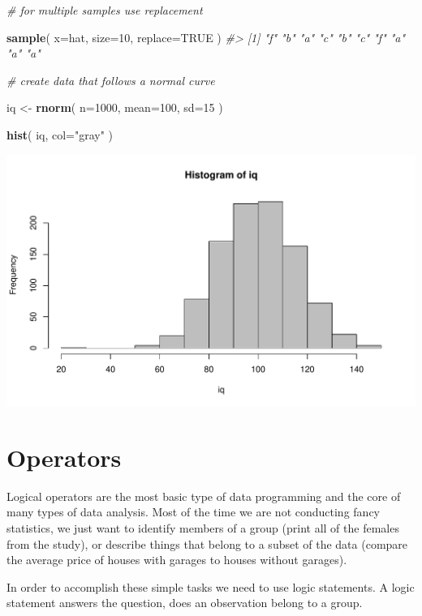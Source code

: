 \documentclass[]{book}
\newenvironment{Shaded}{\begin{snugshade}}{\end{snugshade}}
\newcommand{\CommentTok}[1]{\textcolor[rgb]{0.56,0.35,0.01}{\textit{#1}}}
\newcommand{\DataTypeTok}[1]{\textcolor[rgb]{0.13,0.29,0.53}{#1}}
\newcommand{\DecValTok}[1]{\textcolor[rgb]{0.00,0.00,0.81}{#1}}
\newcommand{\KeywordTok}[1]{\textcolor[rgb]{0.13,0.29,0.53}{\textbf{#1}}}
\newcommand{\NormalTok}[1]{#1}
\newcommand{\OtherTok}[1]{\textcolor[rgb]{0.56,0.35,0.01}{#1}}
\newcommand{\StringTok}[1]{\textcolor[rgb]{0.31,0.60,0.02}{#1}}
\theoremstyle{definition}
\theoremstyle{definition}
\theoremstyle{definition}
\theoremstyle{remark}
\begin{document}
\begin{Shaded}
\begin{Highlighting}[]
\CommentTok{# for multiple samples use replacement}

\KeywordTok{sample}\NormalTok{( }\DataTypeTok{x=}\NormalTok{hat, }\DataTypeTok{size=}\DecValTok{10}\NormalTok{, }\DataTypeTok{replace=}\OtherTok{TRUE}\NormalTok{ )}
\CommentTok{#>  [1] "f" "b" "a" "c" "b" "c" "f" "a" "a" "a"}





\CommentTok{# create data that follows a normal curve}

\NormalTok{iq <-}\StringTok{ }\KeywordTok{rnorm}\NormalTok{( }\DataTypeTok{n=}\DecValTok{1000}\NormalTok{, }\DataTypeTok{mean=}\DecValTok{100}\NormalTok{, }\DataTypeTok{sd=}\DecValTok{15}\NormalTok{ )}

\KeywordTok{hist}\NormalTok{( iq, }\DataTypeTok{col=}\StringTok{"gray"}\NormalTok{ )}
\end{Highlighting}
\end{Shaded}

\begin{center}\includegraphics[width=0.7\linewidth]{DS4PS-I_files/figure-latex/unnamed-chunk-50-1} \end{center}

\hypertarget{operators}{%
\chapter{Operators}\label{operators}}

Logical operators are the most basic type of data programming and the
core of many types of data analysis. Most of the time we are not
conducting fancy statistics, we just want to identify members of a group
(print all of the females from the study), or describe things that
belong to a subset of the data (compare the average price of houses with
garages to houses without garages).

In order to accomplish these simple tasks we need to use logic
statements. A logic statement answers the question, does an observation
belong to a group.
\end{document}
